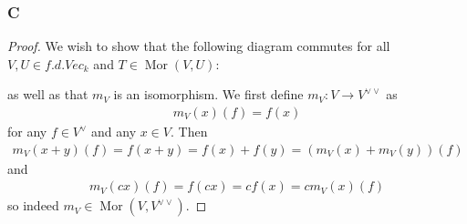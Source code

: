 \documentclass{article}
\DeclareMathOperator{\Mor}{Mor}
\begin{document}
\subsubsection{C}\label{1.2.C}
\begin{proof}
    We wish to show that the following diagram commutes for all $V,U\in f.d.Vec_k$ and $T\in \Mor(V,U)$:
    \begin{center}
    \end{center}
    as well as that $m_V$ is an isomorphism. We first define $m_V:V\to V^{\lor \lor}$ as
    \begin{align*}
        m_V(x)(f)=f(x)
    \end{align*}
    for any $f\in V^\lor$ and any $x\in V$. Then 
    \begin{align*}
        m_V(x+y)(f)=f(x+y)=f(x)+f(y)=(m_V(x)+m_V(y))(f)
    \end{align*}
    and
    \begin{align*}
        m_V(cx)(f)=f(cx)=cf(x)=cm_V(x)(f)
    \end{align*}
    so indeed $m_V\in \Mor(V,V^{\lor \lor})$. 


\end{proof}
\end{document}
